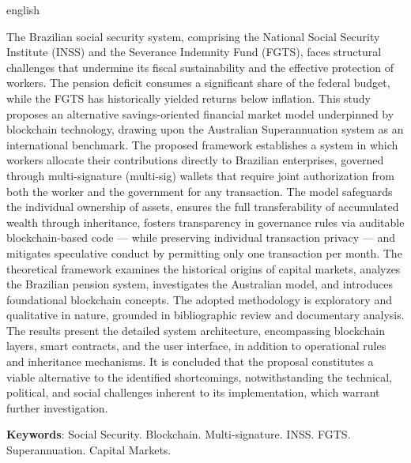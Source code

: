 \begin{otherlanguage*}{english}

The Brazilian social security system, comprising the National Social Security Institute (INSS) and the Severance Indemnity Fund (FGTS), faces structural challenges that undermine its fiscal sustainability and the effective protection of workers. The pension deficit consumes a significant share of the federal budget, while the FGTS has historically yielded returns below inflation. This study proposes an alternative savings-oriented financial market model underpinned by blockchain technology, drawing upon the Australian Superannuation system as an international benchmark. The proposed framework establishes a system in which workers allocate their contributions directly to Brazilian enterprises, governed through multi-signature (multi-sig) wallets that require joint authorization from both the worker and the government for any transaction. The model safeguards the individual ownership of assets, ensures the full transferability of accumulated wealth through inheritance, fosters transparency in governance rules via auditable blockchain-based code --- while preserving individual transaction privacy --- and mitigates speculative conduct by permitting only one transaction per month. The theoretical framework examines the historical origins of capital markets, analyzes the Brazilian pension system, investigates the Australian model, and introduces foundational blockchain concepts. The adopted methodology is exploratory and qualitative in nature, grounded in bibliographic review and documentary analysis. The results present the detailed system architecture, encompassing blockchain layers, smart contracts, and the user interface, in addition to operational rules and inheritance mechanisms. It is concluded that the proposal constitutes a viable alternative to the identified shortcomings, notwithstanding the technical, political, and social challenges inherent to its implementation, which warrant further investigation.

\vspace{\onelineskip}
\noindent\textbf{Keywords}: Social Security. Blockchain. Multi-signature. INSS. FGTS. Superannuation. Capital Markets.
\end{otherlanguage*}
